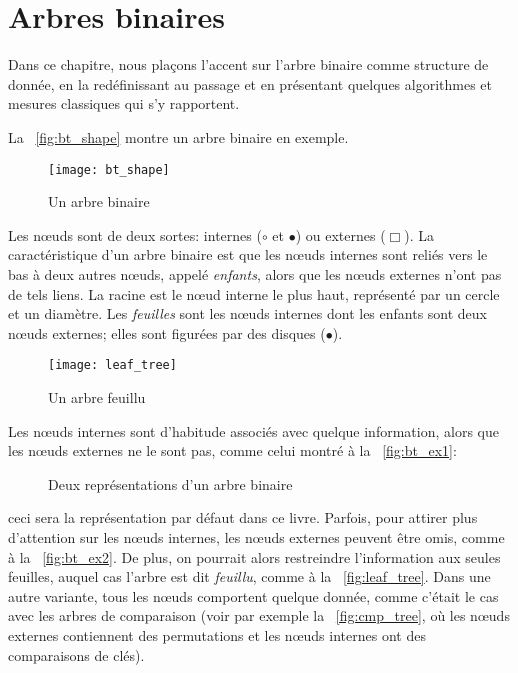 \chapter{Arbres binaires}

Dans ce chapitre, nous plaçons l'accent sur l'arbre binaire
comme structure de donnée, en la redéfinissant au passage et en
présentant quelques algorithmes et mesures classiques qui s'y
rapportent.

La \fig~\vref{fig:bt_shape} montre un arbre binaire en exemple.
\begin{figure}
\centering
\texttt{[image: bt\_shape]}
\caption{Un arbre binaire\label{fig:bt_shape}}
\end{figure}
Les n{\oe}uds sont de deux sortes: internes (\(\circ\) et \(\bullet\)) ou
externes (\(\scriptstyle
\Box\)). La caractéristique d'un arbre binaire est que les n{\oe}uds
internes sont reliés vers le bas à deux autres n{\oe}uds, appelé
\emph{enfants}, alors que les n{\oe}uds
externes n'ont pas de tels liens. La
racine est le n{\oe}ud interne le plus
haut, représenté par un cercle et un diamètre. Les
\emph{feuilles} sont les n{\oe}uds
internes dont les enfants sont deux n{\oe}uds externes; elles sont
figurées par des disques (\(\bullet\)).

%
\begin{figure}
\centering
\texttt{[image: leaf\_tree]}
\caption{Un arbre feuillu\label{fig:leaf_tree}}
\end{figure}
Les n{\oe}uds internes sont d'habitude associés avec quelque
information, alors que les n{\oe}uds externes ne le sont pas, comme
celui montré à la \fig~\vref{fig:bt_ex1}:
\begin{figure}
\centering
{}
\qquad
{}
\caption{Deux représentations d'un arbre binaire\label{fig:bt_ex}}
\end{figure}
ceci sera la représentation par défaut dans ce livre. Parfois, pour
attirer plus d'attention sur les n{\oe}uds internes, les n{\oe}uds
externes peuvent être omis, comme à la \fig~\vref{fig:bt_ex2}. De
plus, on pourrait alors restreindre l'information aux seules feuilles,
auquel cas l'arbre est dit \emph{feuillu}, comme à la \fig~\vref{fig:leaf_tree}. Dans une autre
variante, tous les n{\oe}uds comportent quelque donnée, comme c'était
le cas avec les arbres de comparaison (voir par exemple la
\fig~\vref{fig:cmp_tree}, où les n{\oe}uds externes contiennent des
permutations et les n{\oe}uds internes ont des comparaisons de clés).

